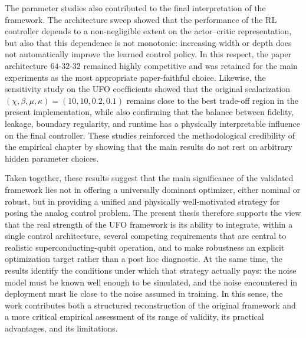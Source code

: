 The parameter studies also contributed to the final interpretation of the framework. The architecture sweep showed that the performance of the RL controller depends to a non-negligible extent on the actor--critic representation, but also that this dependence is not monotonic: increasing width or depth does not automatically improve the learned control policy. In this respect, the paper architecture \(64\text{-}32\text{-}32\) remained highly competitive and was retained for the main experiments as the most appropriate paper-faithful choice. Likewise, the sensitivity study on the UFO coefficients showed that the original scalarization \((\chi,\beta,\mu,\kappa)=(10,10,0.2,0.1)\) remains close to the best trade-off region in the present implementation, while also confirming that the balance between fidelity, leakage, boundary regularity, and runtime has a physically interpretable influence on the final controller. These studies reinforced the methodological credibility of the empirical chapter by showing that the main results do not rest on arbitrary hidden parameter choices.

Taken together, these results suggest that the main significance of the validated framework lies not in offering a universally dominant optimizer, either nominal or robust, but in providing a unified and physically well-motivated strategy for posing the analog control problem. The present thesis therefore supports the view that the real strength of the UFO framework is its ability to integrate, within a single control architecture, several competing requirements that are central to realistic superconducting-qubit operation, and to make robustness an explicit optimization target rather than a post hoc diagnostic. At the same time, the results identify the conditions under which that strategy actually pays: the noise model must be known well enough to be simulated, and the noise encountered in deployment must lie close to the noise assumed in training. In this sense, the work contributes both a structured reconstruction of the original framework and a more critical empirical assessment of its range of validity, its practical advantages, and its limitations.




